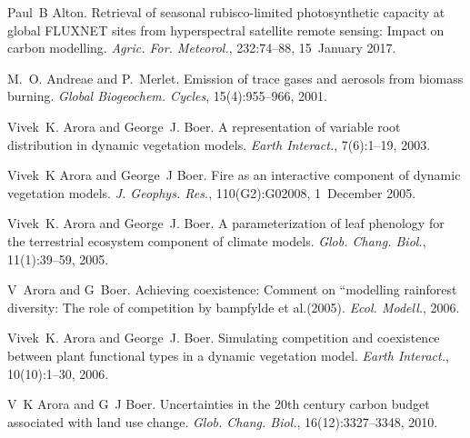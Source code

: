 
\begin{DoxyDescription}
\item[\label{_CITEREF_Alton2017-pd}%
\mbox{[}1\mbox{]}]Paul~B Alton. Retrieval of seasonal rubisco-\/limited photosynthetic capacity at global F\+L\+U\+X\+N\+E\+T sites from hyperspectral satellite remote sensing\+: Impact on carbon modelling. {\itshape Agric. For. Meteorol.}, 232\+:74--88, 15~January 2017. 


\item[\label{_CITEREF_Andreae2001-e04}%
\mbox{[}2\mbox{]}]M.~O. Andreae and P.~Merlet. Emission of trace gases and aerosols from biomass burning. {\itshape Global Biogeochem. Cycles}, 15(4)\+:955--966, 2001. 


\item[\label{_CITEREF_Arora2003838}%
\mbox{[}3\mbox{]}]Vivek~K. Arora and George~J. Boer. A representation of variable root distribution in dynamic vegetation models. {\itshape Earth Interact.}, 7(6)\+:1--19, 2003. 


\item[\label{_CITEREF_Arora20052ac}%
\mbox{[}4\mbox{]}]Vivek~K Arora and George~J Boer. Fire as an interactive component of dynamic vegetation models. {\itshape J. Geophys. Res.}, 110(G2)\+:G02008, 1~December 2005. 


\item[\label{_CITEREF_Arora2005-6b1}%
\mbox{[}5\mbox{]}]Vivek~K. Arora and George~J. Boer. A parameterization of leaf phenology for the terrestrial ecosystem component of climate models. {\itshape Glob. Chang. Biol.}, 11(1)\+:39--59, 2005. 


\item[\label{_CITEREF_Arora2006-pp}%
\mbox{[}6\mbox{]}]V~Arora and G~Boer. Achieving coexistence\+: Comment on ``modelling rainforest diversity\+: The role of competition\textquotesingle{}\textquotesingle{} by bampfylde et al.(2005). {\itshape Ecol. Modell.}, 2006.


\item[\label{_CITEREF_Arora2006-ax}%
\mbox{[}7\mbox{]}]Vivek~K. Arora and George~J. Boer. Simulating competition and coexistence between plant functional types in a dynamic vegetation model. {\itshape Earth Interact.}, 10(10)\+:1--30, 2006. 


\item[\label{_CITEREF_Arora2010-416}%
\mbox{[}8\mbox{]}]V~K Arora and G~J Boer. Uncertainties in the 20th century carbon budget associated with land use change. {\itshape Glob. Chang. Biol.}, 16(12)\+:3327--3348, 2010. 



\end{DoxyDescription}
